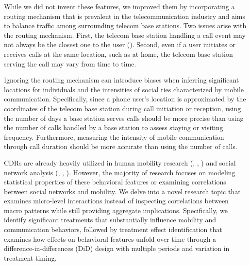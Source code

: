 While we did not invent these features, we improved them by incorporating a routing mechanism that is prevalent in the telecommunication industry and aims to balance traffic among surrounding telecom base stations.
Two issues arise with the routing mechanism.
First, the telecom base station handling a call event may not always be the closest one to the user (\cite{yuan2012correlating}).
Second, even if a user initiates or receives calls at the same location, such as at home, the telecom base station serving the call may vary from time to time.

Ignoring the routing mechanism can introduce biases when inferring significant locations for individuals and the intensities of social ties characterized by mobile communication.
Specifically, since a phone user's location is approximated by the coordinates of the telecom base station during call initiation or reception, using the number of days a base station serves calls should be more precise than using the number of calls handled by a base station to assess staying or visiting frequency.
Furthermore, measuring the intensity of mobile communication through call duration should be more accurate than using the number of calls.


CDRs are already heavily utilized in human mobility research (\cite{gonzalez2008understanding}, \cite{song2010limits}, \cite{wesolowski2016connecting}) and social network analysis (\cite{onnela2007structure}, \cite{cho2011friendship}, \cite{referral_effect_2023aer}).
However, the majority of research focuses on modeling statistical properties of these behavioral features or examining correlations between social networks and mobility.
We delve into a novel research topic that examines micro-level interactions instead of inspecting correlations between macro patterns while still providing aggregate implications. Specifically, we identify significant treatments that substantially influence mobility and communication behaviors, followed by treatment effect identification that examines how effects on behavioral features unfold over time through a difference-in-differences (DiD) design with multiple periods and variation in treatment timing.

